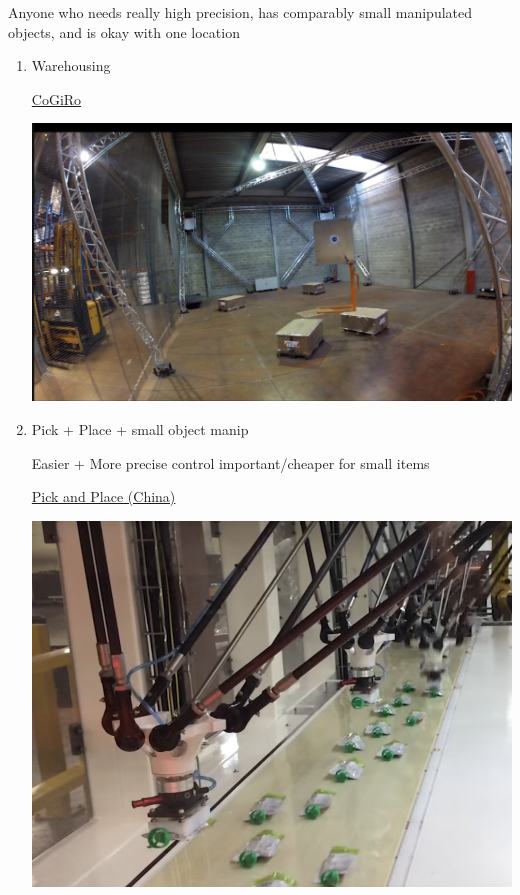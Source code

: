 \documentclass[11pt]{article}
\begin{document}
\begin{enumerate}
Anyone who needs really high precision, has comparably small manipulated objects, and is okay with one location


\begin{enumerate}
\item Warehousing
\label{sec:org2dda25b}

\href{https://www.youtube.com/watch?v=2b4YwFZhtIE}{CoGiRo}

\begin{center}
\includegraphics[width=.9\linewidth]{Applications/2022-07-18_12-43-16_screenshot.png}
\end{center}

\item Pick + Place + small object manip
\label{sec:org86d2c84}

Easier + More precise control important/cheaper for small items

\href{https://www.youtube.com/watch?v=QFZMhsVn\_CE}{Pick and Place (China)}

\begin{center}
\includegraphics[width=.9\linewidth]{Applications/2022-07-18_12-59-12_screenshot.png}
\end{center}


\end{enumerate}
\end{enumerate}
\end{document}
